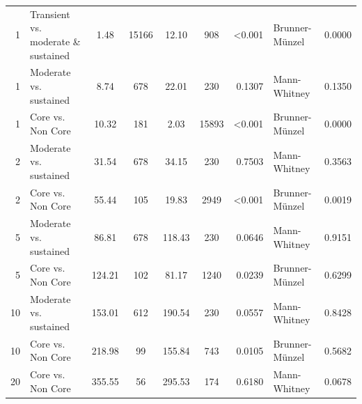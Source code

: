 \begin{table}[H]
\begin{tabular}{r p{4cm} c c c c r l r}
1 & Transient vs. moderate \& sustained &  1.48 & 15166 & 12.10 & 908 & \textless 0.001 &  Brunner-Münzel & 0.0000 \\ 
1 & Moderate vs. sustained &  8.74 & 678 & 22.01 & 230 & 0.1307 &  Mann-Whitney & 0.1350 \\ 
1 & Core vs. Non Core &  10.32 & 181 & 2.03 & 15893 & \textless 0.001 &  Brunner-Münzel & 0.0000 \\ 
2 & Moderate vs. sustained &  31.54 & 678 & 34.15 & 230 & 0.7503 &  Mann-Whitney & 0.3563 \\ 
2 & Core vs. Non Core &  55.44 & 105 & 19.83 & 2949 & \textless 0.001 &  Brunner-Münzel & 0.0019 \\ 
5 & Moderate vs. sustained &  86.81 & 678 & 118.43 & 230 & 0.0646 &  Mann-Whitney & 0.9151 \\ 
5 & Core vs. Non Core &  124.21 & 102 & 81.17 & 1240 & 0.0239 &  Brunner-Münzel & 0.6299 \\ 
10 & Moderate vs. sustained &  153.01 & 612 & 190.54 & 230 & 0.0557 &  Mann-Whitney & 0.8428 \\ 
10 & Core vs. Non Core &  218.98 & 99 & 155.84 & 743 & 0.0105 &  Brunner-Münzel & 0.5682 \\ 
20 & Core vs. Non Core &  355.55 & 56 & 295.53 & 174 & 0.6180 &  Mann-Whitney & 0.0678 \\ 
\bottomrule
\end{tabular}%
\label{tab:codebase_graph_latex_repository_graph_component_time_series_statistical_significance_test_normal_methods} 
\end{table}
\newpage 
